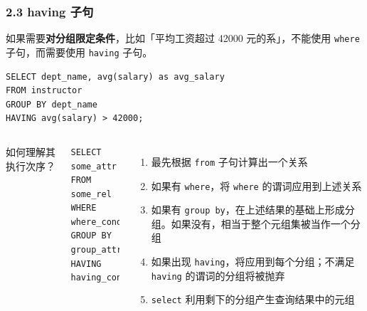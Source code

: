 \documentclass[aspectratio=169, 14pt]{beamer}
\begin{document}
\begin{frame}[fragile]
    \frametitle{2.3 having 子句}
    
    如果需要\textbf{对分组限定条件}，比如「平均工资超过 42000 元的系」，不能使用 \texttt{where} 子句，而需要使用 \texttt{having} 子句。
\pause
    \begin{verbatim}
SELECT dept_name, avg(salary) as avg_salary
FROM instructor
GROUP BY dept_name
HAVING avg(salary) > 42000;
    \end{verbatim} 

\end{frame}

\begin{frame}[fragile]

    \begin{columns}
        如何理解其执行次序？
        \begin{verbatim}
SELECT some_attr
FROM some_rel
WHERE where_cond
GROUP BY group_attr
HAVING having_cond;
        \end{verbatim}         
        \begin{enumerate}
            \item 最先根据 \texttt{from} 子句计算出一个关系
            \item 如果有 \texttt{where}，将 \texttt{where} 的谓词应用到上述关系
            \item 如果有 \texttt{group by}，在上述结果的基础上形成分组。如果没有，相当于整个元组集被当作一个分组
            \item 如果出现 \texttt{having}，将应用到每个分组；不满足 \texttt{having} 的谓词的分组将被抛弃
            \item \texttt{select} 利用剩下的分组产生查询结果中的元组 
        \end{enumerate}
    \end{columns}

\end{frame}
\end{document}
